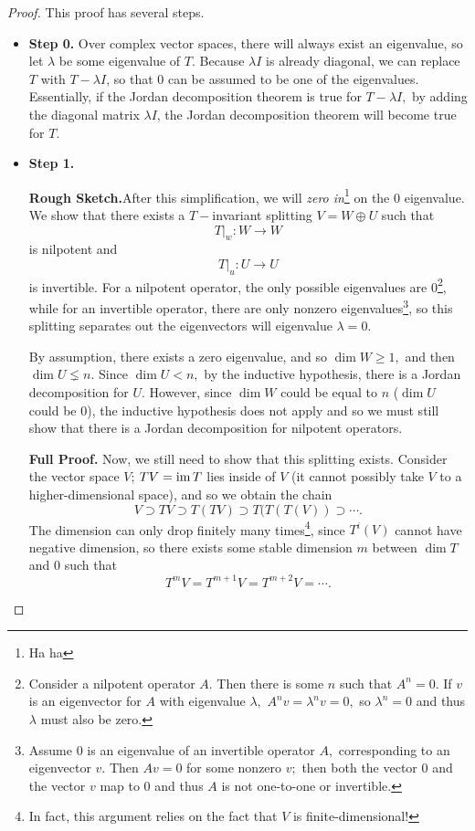\begin{proof}
This proof has several steps.

\begin{itemize}
    \item \textbf{Step 0.} Over complex vector spaces, there will always exist an eigenvalue, so let $\lambda$ be some eigenvalue of $T.$ Because $\lambda I$ is already diagonal, we can replace $T$ with $T - \lambda I$, so that 0 can be assumed to be one of the eigenvalues. Essentially, if the Jordan decomposition theorem is true for $T - \lambda I,$ by adding the diagonal matrix $\lambda I$, the Jordan decomposition theorem will become true for $T.$
    
    \item \textbf{Step 1.} 
    
    \textbf{Rough Sketch.}After this simplification, we will \emph{zero in}\footnote{Ha ha} on the 0 eigenvalue. We show that there exists a $T-$invariant splitting $V = W \oplus U$ such that \[T \big|_w: W \rightarrow W\] is nilpotent and 
    \[T \big|_u: U \rightarrow U\] is invertible. For a nilpotent operator, the only possible eigenvalues are 0\footnote{Consider a nilpotent operator $A.$ Then there is some $n$ such that $A^n = 0.$ If $v$ is an eigenvector for $A$ with eigenvalue $\lambda,$ $A^n v = \lambda^n v = 0,$ so $\lambda^n = 0$ and thus $\lambda$ must also be zero.}, while for an invertible operator, there are only nonzero eigenvalues\footnote{Assume 0 is an eigenvalue of an invertible operator $A,$ corresponding to an eigenvector $v.$ Then $Av = 0$ for some nonzero $v;$ then both the vector 0 and the vector $v$ map to 0 and thus $A$ is not one-to-one or invertible.}, so this splitting separates out the eigenvectors will eigenvalue $\lambda = 0.$
    
    By assumption, there exists a zero eigenvalue, and so $\dim W \geq 1,$ and then $\dim U \lneq n.$ Since $\dim U < n,$ by the inductive hypothesis, there is a Jordan decomposition for $U.$ However, since $\dim W$ could be equal to $n$ ($\dim U$ could be 0), the inductive hypothesis does not apply and so we must still show that there is a Jordan decomposition for nilpotent operators.
    
    \textbf{Full Proof.} Now, we still need to show that this splitting exists. Consider the vector space $V$; $TV = \operatorname{im} T$ lies inside of $V$ (it cannot possibly take $V$ to a higher-dimensional space), and so we obtain the chain \[V \supset TV \supset T(TV) \supset T(T(T(V)) \supset \cdots .\] The dimension can only drop finitely many times\footnote{In fact, this argument relies on the fact that $V$ is finite-dimensional!}, since $T^i(V)$ cannot have negative dimension, so there exists some stable dimension $m$ between $\dim T$ and $0$ such that \[
    T^m V = T^{m + 1}V = T^{m + 2}V = \cdots.
    \]
    

\end{itemize}
\end{proof}
